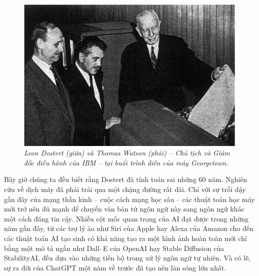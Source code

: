 \begin{multicols}{2}
	\begin{figure}[H]
		\vspace*{-5pt}
		\centering
		\captionsetup{labelformat= empty, justification=centering}
		\includegraphics[width= 1\linewidth]{Georgetown-IBM.png}
		\caption{\small\textit{\color{timhieukhoahoc}Leon Dostert (giữa) và Thomas Watson (phải) -- Chủ tịch và Giám đốc điều hành của IBM -- tại buổi trình diễn của máy Georgetown.}}
		\vspace*{-5pt}
	\end{figure}
	Bây giờ chúng ta đều biết rằng Dostert đã tính toán sai những $60$ năm. Nghiên cứu về dịch máy đã phải trải qua một chặng đường rất dài. Chỉ với sự trỗi dậy gần đây của mạng thần kinh -- cuộc cách mạng học sâu -- các thuật toán học máy mới trở nên đủ mạnh để chuyển văn bản từ ngôn ngữ này sang ngôn ngữ khác một cách đáng tin cậy. 
	\vskip 0.1cm
	Nhiều cột mốc quan trọng của AI đạt được trong những năm gần đây, từ các trợ lý ảo như Siri của Apple hay Alexa của Amazon cho đến các thuật toán AI tạo sinh có khả năng tạo ra một hình ảnh hoàn toàn mới chỉ bằng một mô tả ngắn như Dall--E của OpenAI hay Stable Diffusion của StabilityAI, đều dựa vào những tiến bộ trong xử lý ngôn ngữ tự nhiên. Và có lẽ, sự ra đời của ChatGPT một năm về trước đã tạo nên làn sóng lớn nhất.
	\begin{figure}[H]
		\vspace*{-5pt}
		\centering
		\captionsetup{labelformat= empty, justification=centering}

\end{figure}
\end{multicols}
